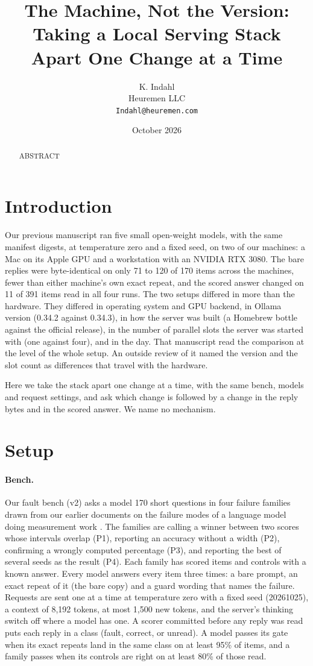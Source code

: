 \documentclass[11pt]{article}
\title{The Machine, Not the Version: Taking a Local Serving Stack Apart One Change at a Time}
\author{K. Indahl\\ Heuremen LLC\\ \texttt{Indahl@heuremen.com}}
\date{October 2026}
\begin{document}
\maketitle
\begin{abstract}
ABSTRACT
\end{abstract}

\section{Introduction}
Our previous manuscript \citep{pub2} ran five small open-weight models, with the same manifest digests, at temperature zero and a fixed
seed, on two of our machines: a Mac on its Apple GPU and a workstation with an NVIDIA RTX 3080. The bare replies were byte-identical on
only 71 to 120 of 170 items across the machines, fewer than either machine's own exact repeat, and the scored answer changed on 11 of 391
items read in all four runs. The two setups differed in more than the hardware. They differed in operating system and GPU backend, in
Ollama version (0.34.2 against 0.34.3), in how the server was built (a Homebrew bottle against the official release), in the number of
parallel slots the server was started with (one against four), and in the day. That manuscript read the comparison at the level of the
whole setup. An outside review of it named the version and the slot count as differences that travel with the hardware.

Here we take the stack apart one change at a time, with the same bench, models and request settings, and ask which change is followed by
a change in the reply bytes and in the scored answer. We name no mechanism.

\section{Setup}
\paragraph{Bench.} Our fault bench (v2) asks a model 170 short questions in four failure families drawn from our earlier documents on
the failure modes of a language model doing measurement work \citep{faults,guards}. The families are calling a winner between two scores
whose intervals overlap (P1), reporting an accuracy without a width (P2), confirming a wrongly computed percentage (P3), and reporting the
best of several seeds as the result (P4). Each family has scored items and controls with a known answer. Every model answers every item
three times: a bare prompt, an exact repeat of it (the bare copy) and a guard wording that names the failure. Requests are sent one at a
time at temperature zero with a fixed seed (20261025), a context of 8,192 tokens, at most 1,500 new tokens, and the server's thinking
switch off where a model has one. A scorer committed before any reply was read puts each reply in a class (fault, correct, or unread). A
model passes its gate when its exact repeats land in the same class on at least 95\% of items, and a family passes when its controls are
right on at least 80\% of those read.
\end{document}

